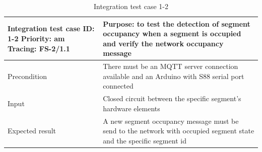 \begin{table}[H]
	\caption{Integration test case 1-2}
	\label{table:TCase-FSI1-2}
	\begin{center}
		\renewcommand{\arraystretch}{1.8}
		\begin{tabu} 
			to 0.9 \textwidth
			{  X[0.4, c] X[c] }
			\toprule
			Integration test case ID: 1-2 \newline Priority: am \newline Tracing: FS-2/1.1 & Purpose: to test the detection of segment occupancy when a segment is occupied and verify the network occupancy message \\ \midrule
			Precondition                                                                   & There must be an MQTT server connection available and an Arduino with S88 serial port connected                         \\
			Input                                                                          & Closed circuit between the specific segment's hardware elements                                                         \\
			Expected result                                                                & A new segment occupancy message must be send to the network with occupied segment state  and the specific segment id              \\ \bottomrule
		\end{tabu}
	\end{center}
\end{table} 

